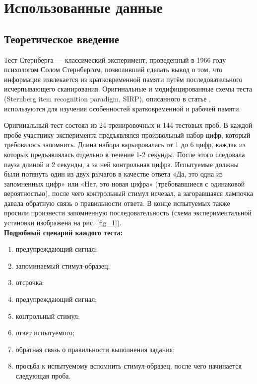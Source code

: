 \newpage

\section{Использованные данные}

\subsection{Теоретическое введение}

Тест Стернберга --- классический эксперимент, проведенный в 1966 году психологом
Солом Стернбергом, позволивший сделать вывод о том, что информация извлекается из
кратковременной памяти путём последовательного исчерпывающего сканирования.
Оригинальные и модифицированные схемы теста (Sternberg item recognition paradigm,
SIRP), описанного в статье \cite{Sternberg_item_recognition}, используются для изучения особенностей кратковременной и рабочей памяти. 

Оригинальный тест состоял из 24 тренировочных и 144 тестовых проб. В каждой пробе участнику эксперимента
предъявлялся произвольный набор цифр, который требовалось запомнить. Длина набора
варьировалась от 1 до 6 цифр, каждая из которых предъявлялась отдельно в течение 1-2 секунды.
После этого следовала пауза длиной в 2 секунды, а за ней контрольная цифра. Испытуемые должны
были потянуть один из двух рычагов в качестве ответа «Да, это одна из запомненных цифр» или «Нет,
это новая цифра» (требовавшиеся с одинаковой вероятностью), после чего контрольный стимул исчезал,
а загоравшаяся лампочка давала обратную связь о правильности ответа. В конце испытуемых также
просили произнести запомненную последовательность (схема экспериментальной установки изображена
на рис. \ref{fig_1}). \\[0.3 cm]
\textbf{Подробный сценарий каждого теста:}

\begin{enumerate}
    \item предупреждающий сигнал;
    \item запоминаемый стимул-образец;
    \item отсрочка;
    \item предупреждающий сигнал;
    \item контрольный стимул;
    \item ответ испытуемого;
    \item обратная связь о правильности выполнения задания;
    \item просьба к испытуемому вспомнить стимул-образец, после чего начинается следующая проба.
\end{enumerate}

